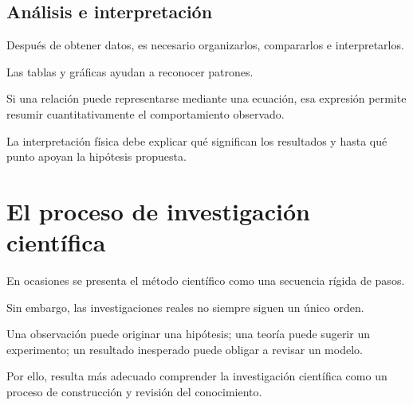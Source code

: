 \subsection{Análisis e interpretación}

Después de obtener datos, es necesario organizarlos,
compararlos e interpretarlos.

Las tablas y gráficas ayudan a reconocer patrones.

Si una relación puede representarse mediante una ecuación,
esa expresión permite resumir cuantitativamente
el comportamiento observado.

La interpretación física debe explicar qué significan
los resultados y hasta qué punto apoyan
la hipótesis propuesta.


\section{El proceso de investigación científica}

En ocasiones se presenta el método científico como
una secuencia rígida de pasos.

Sin embargo, las investigaciones reales no siempre
siguen un único orden.

Una observación puede originar una hipótesis;
una teoría puede sugerir un experimento;
un resultado inesperado puede obligar
a revisar un modelo.

Por ello, resulta más adecuado comprender
la investigación científica como un proceso
de construcción y revisión del conocimiento.

\begin{center}
\end{center}

